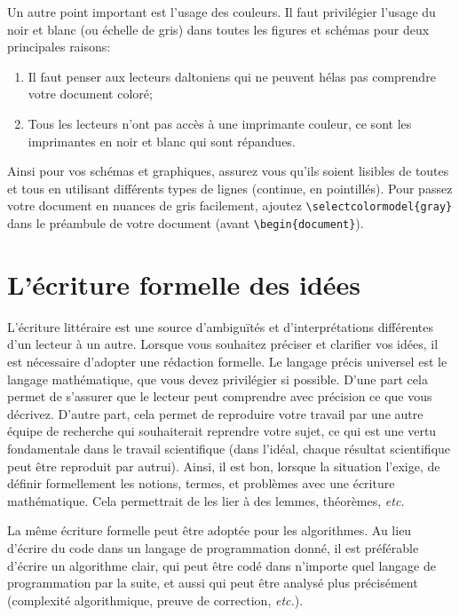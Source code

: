 \documentclass{rapport}
\def\etc{\textit{etc.}\xspace}
\begin{document}
        Un autre point important est l'usage des couleurs. Il faut privilégier l'usage du noir et blanc (ou échelle de gris) dans toutes les figures et schémas pour deux principales raisons:
        \begin{enumerate}
          \item  Il faut penser aux lecteurs daltoniens qui ne peuvent hélas pas comprendre votre document coloré;
          \item Tous les lecteurs n'ont pas accès à une imprimante couleur, ce sont les imprimantes en noir et blanc qui sont répandues.
        \end{enumerate}
        
        Ainsi pour vos schémas et graphiques, assurez vous qu'ils soient lisibles de toutes et tous en utilisant différents types de lignes (continue, en pointillés). Pour passez votre document en nuances de gris facilement, ajoutez \verb:\selectcolormodel{gray}: dans le préambule de votre document (avant \verb:\begin{document}:).
        
    \section{L'écriture formelle des idées} 
      L'écriture littéraire est une source d'ambiguïtés et d'interprétations différentes d'un lecteur à un autre. Lorsque vous souhaitez préciser et clarifier vos idées, il est nécessaire d'adopter une rédaction formelle. Le langage précis universel est le langage mathématique, que vous devez privilégier si possible. D'une part cela permet de s'assurer que le lecteur peut comprendre avec précision ce que vous décrivez. D'autre part, cela permet de reproduire votre travail par une autre équipe de recherche qui souhaiterait reprendre votre sujet, ce qui est une vertu fondamentale dans le travail scientifique (dans l'idéal, chaque résultat scientifique peut être reproduit par autrui).  Ainsi, il est bon, lorsque la situation l'exige, de définir formellement les notions, termes, et problèmes avec une écriture mathématique. Cela permettrait de les lier à des lemmes, théorèmes, \etc 

      La même écriture formelle peut être adoptée pour les algorithmes. Au lieu d'écrire du code dans un langage de programmation donné, il est préférable d'écrire un algorithme clair, qui peut être codé dans n'importe quel langage de programmation par la suite, et aussi qui peut être analysé plus précisément (complexité algorithmique, preuve de correction, \etc).
\end{document}
